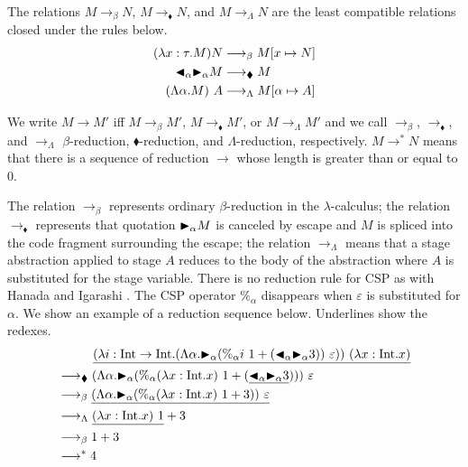 \begin{definition}[Reduction]
    The relations $M \longrightarrow_\beta N$, $M \longrightarrow_\blacklozenge N$, and $M \longrightarrow_\Lambda N$
    are the least compatible relations closed under the rules below.
{%
    \begin{align*}
         (\lambda x:\tau.M) N & \longrightarrow_\beta M[x \mapsto N]         \\
         {\mathop{\blacktriangleleft}}_\alpha {\mathop{\blacktriangleright}}_\alpha M & \longrightarrow_\blacklozenge M          \\
         (\Lambda \alpha.M)\ A & \longrightarrow_\Lambda M[\alpha \mapsto A]
    \end{align*}
  }    
\end{definition}
We write $ M \longrightarrow M'$ iff $ M \longrightarrow_\beta M'$,
$ M \longrightarrow_\blacklozenge M'$, or
$ M \longrightarrow_\Lambda M'$ and we call $\longrightarrow_\beta$,
$\longrightarrow_\blacklozenge$, and $\longrightarrow_\Lambda$
$\beta$-reduction, $\blacklozenge$-reduction, and $\Lambda$-reduction,
respectively.
$M \longrightarrow^* N$ means that there is a sequence of reduction $\longrightarrow$ whose length is greater than or equal to 0.

The relation $\longrightarrow_\beta$ represents ordinary $\beta$-reduction in the \(\lambda\)-calculus; the relation
$\longrightarrow_\blacklozenge$ represents that quotation ${\mathop{\blacktriangleright}}_\alpha M$ is canceled by escape and $M$ is spliced into the code fragment surrounding the escape;
the relation $\longrightarrow_\Lambda$ means that a stage abstraction applied to  stage $A$ reduces to the body of the abstraction
where $A$ is substituted for the stage variable.
There is no reduction rule for CSP as with Hanada and Igarashi \cite{Hanada2014}.
The CSP operator $\%_\alpha$ disappears when $\varepsilon$ is substituted for $\alpha$.
We show an example of a reduction sequence below.
Underlines show the redexes.
\begin{align*}
     & \hspace{10mm} \underline{(\lambda i:\I\to\I.(\Lambda\alpha.\TB_\alpha (\%_\alpha i\ 1 + (\TBL_\alpha \TB_\alpha 3))\ \varepsilon))\ (\lambda x:\I.x)} \\
     & \longrightarrow_\blacklozenge (\Lambda\alpha.\TB_\alpha (\%_\alpha (\lambda x:\I.x)\ 1 + (\underline{\TBL_\alpha \TB_\alpha 3})))\ \varepsilon        \\
     & \longrightarrow_\beta \underline{(\Lambda\alpha.\TB_\alpha (\%_\alpha (\lambda x:\I.x)\ 1 + 3))\ \varepsilon}                                         \\
     & \longrightarrow_\Lambda \underline{(\lambda x:\I.x)\ 1} + 3                                                                                           \\
     & \longrightarrow_\beta 1 + 3                                                                                                                           \\
     & \longrightarrow^* 4
\end{align*}

